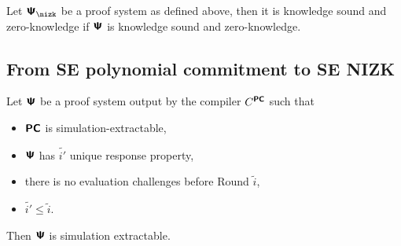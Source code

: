 \documentclass[runningheads,11pt]{llncs}
\begin{document}
\begin{theorem}
  Let $\PSc$ be a proof system as defined above, then it is knowledge sound and
  zero-knowledge if $\bm{\mathsf{\Psi}}$ is knowledge sound and zero-knowledge.
\end{theorem}
  
\subsection{From SE polynomial commitment to SE NIZK}
\begin{theorem}
  Let $\bm{\mathsf{\Psi}}$ be a proof system output by the compiler $C^{\bm{\mathsf{PC}}}$  such that
  \begin{itemize}
  \item $\bm{\mathsf{PC}}$ is simulation-extractable,
  \item $\bm{\mathsf{\Psi}}$ has $\tilde{i'}$ unique response property,
  \item there is no evaluation challenges before Round $\tilde{i}$,
  \item $\tilde{i'} \leq \tilde{i}$.
  \end{itemize}
  Then $\bm{\mathsf{\Psi}}$ is simulation extractable.
\end{theorem}
\end{document}
